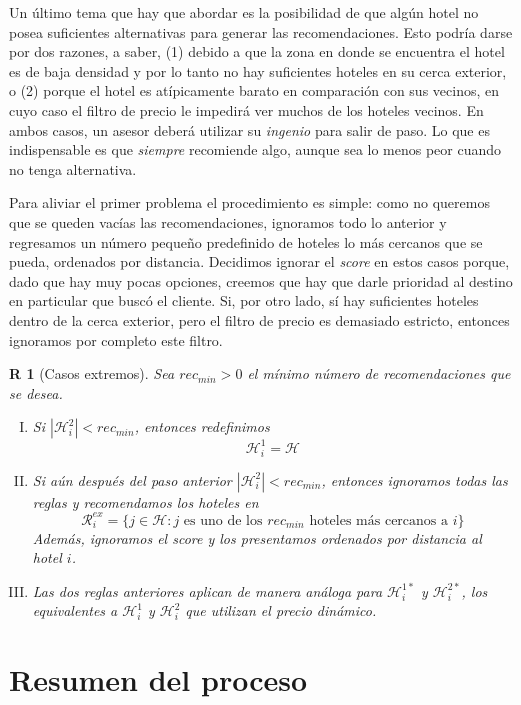 \documentclass[12pt]{report}
\newcommand{\HH}{\mathcal{H}}
\newcommand{\RR}{\mathcal{R}}
\newtheorem{regla}{R}%
\begin{document}
Un último tema que hay que abordar es la posibilidad de que algún hotel no posea suficientes alternativas para generar las recomendaciones. Esto podría darse por dos razones, a saber, (1) debido a que la zona en donde se encuentra el hotel es de baja densidad y por lo tanto no hay suficientes hoteles en su cerca exterior, o (2) porque el hotel es atípicamente barato en comparación con sus vecinos, en cuyo caso el filtro de precio le impedirá ver muchos de los hoteles vecinos. En ambos casos, un asesor deberá utilizar su \emph{ingenio} para salir de paso. Lo que es indispensable es que \emph{siempre} recomiende algo, aunque sea lo menos peor cuando no tenga alternativa.

Para aliviar el primer problema el procedimiento es simple: como no queremos que se queden vacías las recomendaciones, ignoramos todo lo anterior y regresamos un número pequeño predefinido de hoteles lo más cercanos que se pueda, ordenados por distancia. Decidimos ignorar el \emph{score} en estos casos porque, dado que hay muy pocas opciones, creemos que hay que darle prioridad al destino en particular que buscó el cliente. Si, por otro lado, sí hay suficientes hoteles dentro de la cerca exterior, pero el filtro de precio es demasiado estricto, entonces ignoramos por completo este filtro.
\begin{regla}[Casos extremos] \label{r:casosextremos}
Sea $rec_{min} > 0$ el mínimo número de recomendaciones que se desea.
\begin{enumerate}[(I)]
	\item Si $|\HH_i^2| < rec_{min}$, entonces redefinimos
		\[
			\HH_i^1 = \HH
		\]
	\item Si aún después del paso anterior $|\HH_i^2| < rec_{min}$, entonces ignoramos todas las reglas y recomendamos los hoteles en
	\[
		\RR_i^{ex} = \{j \in \HH : j \text{ es uno de los } rec_{min} \text{ hoteles más cercanos a } i\}
	\]
	Además, ignoramos el score y los presentamos ordenados por distancia al hotel $i$.
	\item Las dos reglas anteriores aplican de manera análoga para $\HH_i^{1*}$ y $\HH_i^{2*}$, los equivalentes a $\HH_i^{1}$ y $\HH_i^{2}$ que utilizan el precio dinámico.
\end{enumerate}
\end{regla}

\section{Resumen del proceso}
\end{document}
